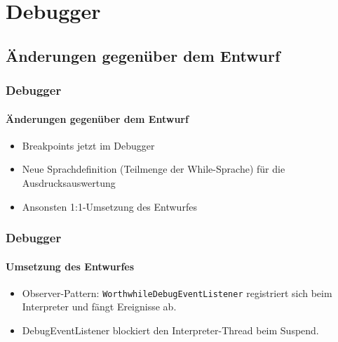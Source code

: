 \section{Debugger}

\subsection{Änderungen gegenüber dem Entwurf}
\begin{frame}
\frametitle{Debugger}
\framesubtitle{Änderungen gegenüber dem Entwurf}
\begin{itemize}
	\item Breakpoints jetzt im Debugger
	\item Neue Sprachdefinition (Teilmenge der While-Sprache) für die Ausdrucksauswertung
	\item Ansonsten 1:1-Umsetzung des Entwurfes
\end{itemize}
\end{frame}

\begin{frame}
\frametitle{Debugger}
\framesubtitle{Umsetzung des Entwurfes}
\begin{itemize}
	\item Observer-Pattern: \texttt{WorthwhileDebugEventListener} registriert sich beim Interpreter und fängt Ereignisse ab.
	\item DebugEventListener blockiert den Interpreter-Thread beim Suspend.
\end{itemize}
\end{frame}


